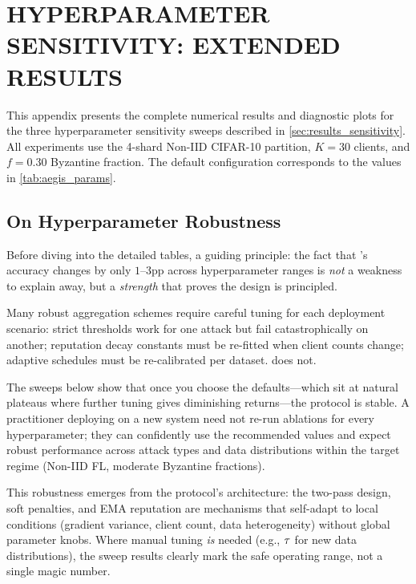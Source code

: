 \documentclass[../main]{subfiles}
\begin{document}
\chapter{HYPERPARAMETER SENSITIVITY: EXTENDED RESULTS}
\label{app:hyperparams}

This appendix presents the complete numerical results and diagnostic plots for the three
hyperparameter sensitivity sweeps described in \cref{sec:results_sensitivity}.
All experiments use the 4-shard Non-IID CIFAR-10 partition, $K = 30$ clients,
and $f = 0.30$ Byzantine fraction.
The default configuration corresponds to the values in
\cref{tab:aegis_params}.

\section*{On Hyperparameter Robustness}
\label{app:hp_robustness}

Before diving into the detailed tables, a guiding principle: the fact that \aegis{}'s accuracy
changes by only $1$--$3$pp across hyperparameter ranges is \emph{not} a weakness to explain away,
but a \emph{strength} that proves the design is principled.

Many robust aggregation schemes require careful tuning for each deployment scenario: strict thresholds work for
one attack but fail catastrophically on another; reputation decay constants must be re-fitted when client counts change;
adaptive schedules must be re-calibrated per dataset. \aegis{} does not.

The sweeps below show that once you choose the defaults---which sit at natural plateaus where further tuning gives
diminishing returns---the protocol is stable. A practitioner deploying \aegis{} on a new system need not re-run ablations
for every hyperparameter; they can confidently use the recommended values and expect robust performance across attack types
and data distributions within the target regime (Non-IID FL, moderate Byzantine fractions).

This robustness emerges from the protocol's architecture: the two-pass design, soft penalties, and EMA reputation
are mechanisms that self-adapt to local conditions (gradient variance, client count, data heterogeneity) without global
parameter knobs. Where manual tuning \emph{is} needed (e.g., $\tau$ for new data distributions), the sweep results
clearly mark the safe operating range, not a single magic number.
\end{document}
